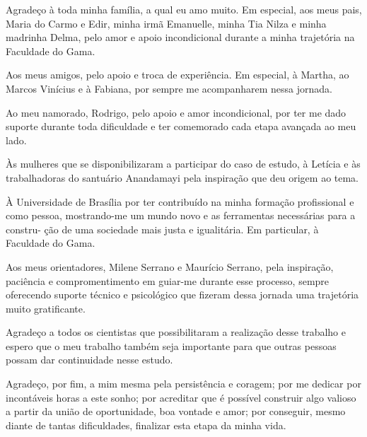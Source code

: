 \begin{agradecimentos}

    Agradeço à toda minha família, a qual eu amo muito. Em especial, aos meus pais,
    Maria do Carmo e Edir, minha irmã Emanuelle, minha Tia Nilza e minha madrinha
    Delma, pelo amor e apoio incondicional durante a minha trajetória na Faculdade do Gama.
    
    Aos meus amigos, pelo apoio e troca de experiência. Em especial, à Martha, ao Marcos
    Vinícius e à Fabiana, por sempre me acompanharem nessa jornada. 
    
    Ao meu namorado, Rodrigo, pelo apoio e amor incondicional, por ter me dado
    suporte durante toda dificuldade e ter comemorado cada etapa avançada ao meu lado.
    
    Às mulheres que se disponibilizaram a participar do caso de estudo, à Letícia e às trabalhadoras do santuário Anandamayi pela inspiração que deu origem ao tema.
    
    À Universidade de Brasília por ter contribuído na minha formação profissional e
    como pessoa, mostrando-me um mundo novo e as ferramentas necessárias para a constru-
    ção de uma sociedade mais justa e igualitária. Em particular, à Faculdade do Gama.
    
    Aos meus orientadores, Milene Serrano e Maurício Serrano, pela inspiração, paciência e compromentimento 
    em guiar-me durante esse processo, sempre oferecendo suporte técnico e psicológico que fizeram 
    dessa jornada uma trajetória muito gratificante. 
    
    Agradeço a todos os cientistas que possibilitaram a realização desse trabalho e espero que 
    o meu trabalho também seja importante para que outras pessoas possam dar continuidade nesse 
    estudo. 
    
    Agradeço, por fim, a mim mesma pela persistência e coragem; por me dedicar por
    incontáveis horas a este sonho; por acreditar que é possível construir algo valioso a partir
    da união de oportunidade, boa vontade e amor; por conseguir, mesmo diante de tantas
    dificuldades, finalizar esta etapa da minha vida.
    
    \end{agradecimentos}
    